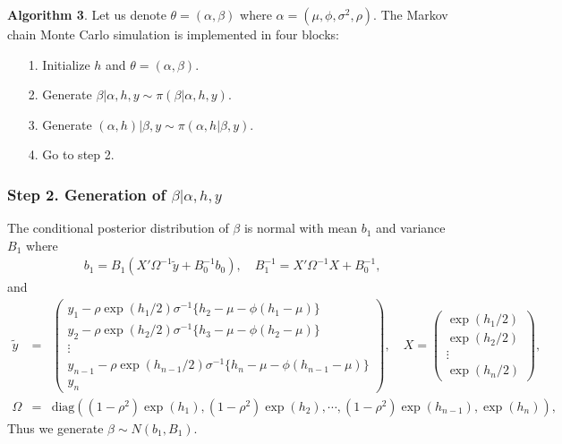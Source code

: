 \noindent
\textbf{Algorithm 3}.
Let us denote $\theta = (\alpha,\beta)$ where $\alpha = (\mu,\phi,\sigma^2,\rho)$. The Markov chain Monte Carlo simulation is implemented in four blocks:
\begin{itemize}
    \item[1.] Initialize $h$ and $\theta=(\alpha,\beta)$.
    \item[2.] Generate $\beta|\alpha,h, y \sim \pi(\beta|\alpha,h, y)$.
    \item[3.] Generate $(\alpha,h)|\beta, y \sim \pi(\alpha,h|\beta, y)$.
    \item[4.] Go to step 2.
\end{itemize}
\subsubsection*{Step 2. Generation of $\beta|\alpha,h,y$}
The conditional posterior distribution of $\beta$ is normal with mean $b_1$ and variance $B_1$ where
\begin{eqnarray*}
b_1 = B_1 \left(X'\Omega^{-1}\tilde{y} + B_0^{-1}b_0\right), \quad 
B_1^{-1} = X'\Omega^{-1}X + B_0^{-1},
\end{eqnarray*}
and
\begin{eqnarray*}
\tilde{y}&=&
\left(
	\begin{array}{c} 
	y_1 - \rho \exp(h_1/2)\sigma^{-1}\{h_2-\mu-\phi(h_1-\mu)\}\\
	y_2 - \rho \exp(h_2/2)\sigma^{-1}\{h_3-\mu-\phi(h_2-\mu)\}\\
        \vdots \\
	y_{n-1} - \rho \exp(h_{n-1}/2)\sigma^{-1}\{h_n-\mu-\phi(h_{n-1}-\mu)\}\\
 	y_n
	\end{array}  \right),
\quad
X = \left(\begin{array}{c}  \exp(h_1/2) \\  \exp(h_2/2) \\  \vdots \\ \exp(h_n/2)  \end{array}  \right),
\\
\Omega &=& \mbox{diag}\left((1-\rho^2)\exp(h_1),(1-\rho^2)\exp(h_2),\cdots,(1-\rho^2)\exp(h_{n-1}), \exp(h_n)\right),
\end{eqnarray*}
Thus we generate $\beta \sim N(b_1,B_1).$

